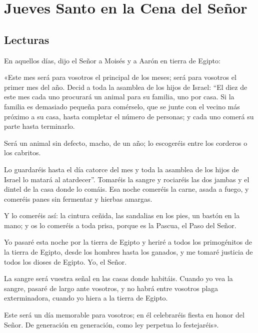 \chapter{Jueves Santo en la Cena del Señor}

\section{Lecturas}


 


\begin{scripture}
En aquellos días, dijo el Señor a Moisés y a Aarón en tierra de Egipto: 	

«Este mes será para vosotros el principal de los meses; será para vosotros el primer mes del año. Decid a toda la asamblea de los hijos de Israel: “El diez de este mes cada uno procurará un animal para su familia, uno por casa. Si la familia es demasiado pequeña para comérselo, que se junte con el vecino más próximo a su casa, hasta completar el número de personas; y cada uno comerá su parte hasta terminarlo. 

Será un animal sin defecto, macho, de un año; lo escogeréis entre los corderos o los cabritos. 

Lo guardaréis hasta el día catorce del mes y toda la asamblea de los hijos de Israel lo matará al atardecer”. Tomaréis la sangre y rociaréis las dos jambas y el dintel de la casa donde lo comáis. Esa noche comeréis la carne, asada a fuego, y comeréis panes sin fermentar y hierbas amargas.

Y lo comeréis así: la cintura ceñida, las sandalias en los pies, un bastón en la mano; y os lo comeréis a toda prisa, porque es la Pascua, el Paso del Señor. 

Yo pasaré esta noche por la tierra de Egipto y heriré a todos los primogénitos de la tierra de Egipto, desde los hombres hasta los ganados, y me tomaré justicia de todos los dioses de Egipto. Yo, el Señor. 

La sangre será vuestra señal en las casas donde habitáis. Cuando yo vea la sangre, pasaré de largo ante vosotros, y no habrá entre vosotros plaga exterminadora, cuando yo hiera a la tierra de Egipto. 

Este será un día memorable para vosotros; en él celebraréis fiesta en honor del Señor. De generación en generación, como ley perpetua lo festejaréis».

\end{scripture}

